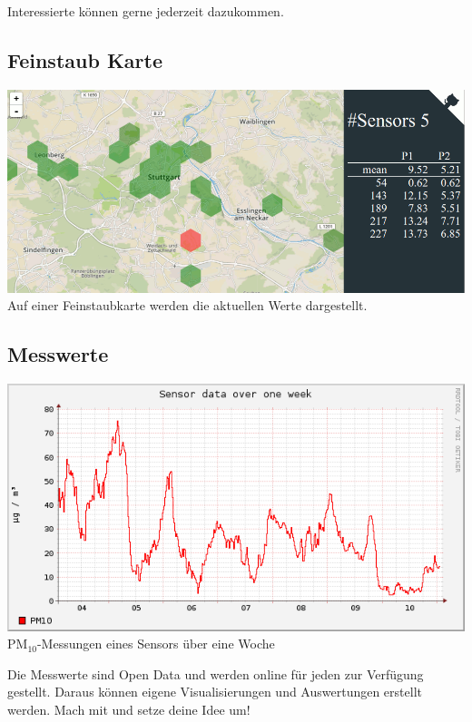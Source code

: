 \documentclass[
notumble,
]{leaflet}
\begin{document}
Interessierte können gerne jederzeit dazukommen.

% 
% 

\subsection{Feinstaub Karte}
\includegraphics[width=\textwidth]{images/feinstaubmap_2016-11}\\%
Auf einer Feinstaubkarte werden die aktuellen Werte dargestellt.


\subsection{Messwerte}
\includegraphics[width=\textwidth]{images/sensor-esp8266-746839-sds011-1-week.png}\\%
PM$_{10}$-Messungen eines Sensors über eine Woche

Die Messwerte sind Open Data und werden online für jeden zur Verfügung gestellt.
Daraus können eigene Visualisierungen und Auswertungen erstellt werden.
Mach mit und setze deine Idee um!
\end{document}
